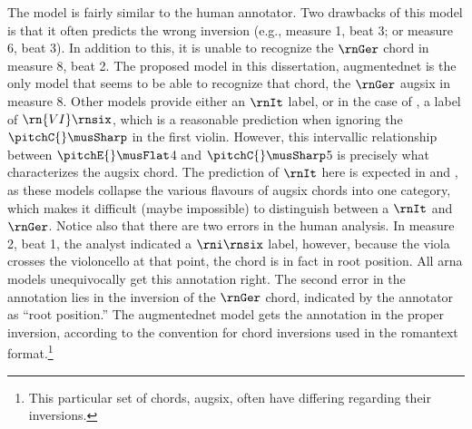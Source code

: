The \textcite{mcleod2021modular} model is fairly similar to
the human annotator. Two drawbacks of this model is that it
often predicts the wrong inversion (e.g., measure 1, beat 3;
or measure 6, beat 3). In addition to this, it is unable to
recognize the $\rnGer$ chord in measure 8, beat 2. The
proposed model in this dissertation, \gls{augmentednet} is
the only model that seems to be able to recognize that
chord, the $\rnGer$ \gls{augsix} in measure 8. Other models
provide either an $\rnIt$ label, or in the case of
\textcite{mcleod2021modular}, a label of $\rn{VI}\rnsix$,
which is a reasonable prediction when ignoring the
$\pitchC{}\musSharp$ in the first violin. However, this
intervallic relationship between $\pitchE{}\musFlat$4 and
$\pitchC{}\musSharp$5 is precisely what characterizes the
\gls{augsix} chord. The prediction of $\rnIt$ here is
expected in \textcite{chen2021attend} and
\textcite{micchi2021deep}, as these models collapse the
various flavours of \gls{augsix} chords into one category,
which makes it difficult (maybe impossible) to distinguish
between a $\rnIt$ and $\rnGer$. Notice also that there are
two errors in the human analysis. In measure 2, beat 1, the
analyst indicated a $\rni\rnsix$ label, however, because the
viola crosses the violoncello at that point, the chord is in
fact in root position. All \gls{arna} models unequivocally
get this annotation right. The second error in the
annotation lies in the inversion of the $\rnGer$ chord,
indicated by the annotator as ``root position.'' The
\gls{augmentednet} model gets the annotation in the proper
inversion, according to the convention for chord inversions
used in the \gls{romantext} format.\footnote{This particular
set of chords, \gls{augsix}, often have differing regarding
their inversions.}


